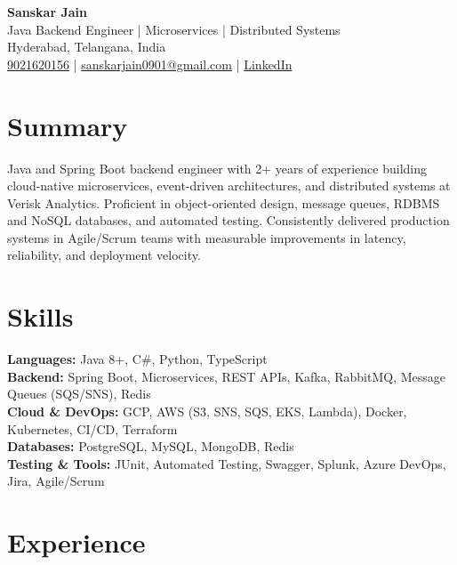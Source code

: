 \documentclass[a4paper,10pt]{article}
\begin{document}
\begin{center}
    {\LARGE \textbf{Sanskar Jain}} \\
    Java Backend Engineer | Microservices | Distributed Systems \\
    Hyderabad, Telangana, India \\
    \href{tel:9021620156}{9021620156} \;|\;
    \href{mailto:sanskarjain0901@gmail.com}{sanskarjain0901@gmail.com} \;|\;
    \href{https://www.linkedin.com/in/sanskar-jain0901/}{LinkedIn}
\end{center}

\vspace{3pt}

\section*{Summary}
Java and Spring Boot backend engineer with 2+ years of experience building cloud-native microservices, event-driven architectures, and distributed systems at Verisk Analytics.
Proficient in object-oriented design, message queues, RDBMS and NoSQL databases, and automated testing.
Consistently delivered production systems in Agile/Scrum teams with measurable improvements in latency, reliability, and deployment velocity.

\section*{Skills}
\textbf{Languages:} Java 8+, C\#, Python, TypeScript \\
\textbf{Backend:} Spring Boot, Microservices, REST APIs, Kafka, RabbitMQ, Message Queues (SQS/SNS), Redis \\
\textbf{Cloud \& DevOps:} GCP, AWS (S3, SNS, SQS, EKS, Lambda), Docker, Kubernetes, CI/CD, Terraform \\
\textbf{Databases:} PostgreSQL, MySQL, MongoDB, Redis \\
\textbf{Testing \& Tools:} JUnit, Automated Testing, Swagger, Splunk, Azure DevOps, Jira, Agile/Scrum

\section*{Experience}
\end{document}
